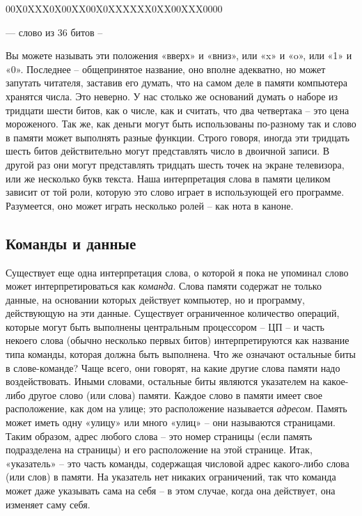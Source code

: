 \documentclass[../main.tex]{subfiles}
\begin{document}
00X0XXX0X00XX00X0XXXXXX0XX00XXX0000

--- слово из 36 битов \---

Вы можете называть эти положения «вверх» и «вниз», или «x» и «o», или «1» и «0». Последнее \--- общепринятое название, оно вполне адекватно, но может запутать читателя, заставив его думать, что на самом деле в памяти компьютера хранятся числа. Это неверно. У нас столько же оснований думать о наборе из тридцати шести битов, как о числе, как и считать, что два четвертака \--- это цена мороженого. Так же, как деньги могут быть использованы по-разному так и слово в памяти может выполнять разные функции. Строго говоря, иногда эти тридцать шесть битов действительно могут представлять число в двоичной записи. В другой раз они могут представлять тридцать шесть точек на экране телевизора, или же несколько букв текста. Наша интерпретация слова в памяти целиком зависит от той роли, которую это слово играет в использующей его программе. Разумеется, оно может играть несколько ролей \--- как нота в каноне.


\subsection{Команды и данные}

Существует еще одна интерпретация слова, о которой я пока не упоминал слово может интерпретироваться как \emph{команда}. Слова памяти содержат не только данные, на основании которых действует компьютер, но и программу, действующую на эти данные. Существует ограниченное количество операций, которые могут быть выполнены центральным процессором \--- ЦП \--- и часть некоего слова (обычно несколько первых битов) интерпретируются как название типа команды, которая должна быть выполнена. Что же означают остальные биты в слове-команде? Чаще всего, они говорят, на какие другие слова памяти надо воздействовать. Иными словами, остальные биты являются указателем на какое-либо другое слово (или слова) памяти. Каждое слово в памяти имеет свое расположение, как дом на улице; это расположение называется \emph{адресом}. Память может иметь одну «улицу» или много «улиц» \--- они называются страницами. Таким образом, адрес любого слова \--- это номер страницы (если память подразделена на страницы) и его расположение на этой странице. Итак, «указатель» \--- это часть команды, содержащая числовой адрес какого-либо слова (или слов) в памяти. На указатель нет никаких ограничений, так что команда может даже указывать сама на себя \--- в этом случае, когда она действует, она изменяет саму себя.
\end{document}
